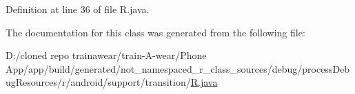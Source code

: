 Definition at line 36 of file R.\+java.



The documentation for this class was generated from the following file\+:\begin{DoxyCompactItemize}
\item 
D\+:/cloned repo trainawear/train-\/\+A-\/wear/\+Phone App/app/build/generated/not\+\_\+namespaced\+\_\+r\+\_\+class\+\_\+sources/debug/process\+Debug\+Resources/r/android/support/transition/\mbox{\hyperlink{process_debug_resources_2r_2android_2support_2transition_2_r_8java}{R.\+java}}\end{DoxyCompactItemize}
